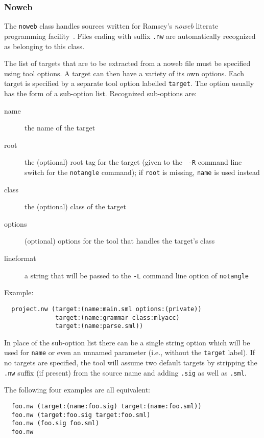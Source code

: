\documentclass[titlepage,letterpaper]{article}
\begin{document}
\subsubsection{Noweb}
\label{sec:builtin-tools:noweb}

The {\tt noweb} class handles sources written for Ramsey's {\it noweb}
literate programming facility~\cite{ramsey:simplified}.  Files ending
with suffix {\tt .nw} are automatically recognized as belonging to
this class.

The list of targets that are to be extracted from a noweb file must be
specified using tool options.  A target can then have a variety of its
own options.  Each target is specified by a separate tool option
labelled {\tt target}.  The option usually has the form of a
sub-option list.  Recognized sub-options are:

\begin{description}
\item[name] the name of the target
\item[root] the (optional) root tag for the target (given to the {\tt
-R} command line switch for the {\tt notangle} command); if {\tt root}
is missing, {\tt name} is used instead
\item[class] the (optional) class of the target
\item[options] (optional) options for the tool that handles the
target's class
\item[lineformat] a string that will be passed to the {\tt -L} command
line option of {\tt notangle}
\end{description}

Example:

\begin{verbatim}
  project.nw (target:(name:main.sml options:(private))
              target:(name:grammar class:mlyacc)
              target:(name:parse.sml))
\end{verbatim}

In place of the sub-option list there can be a single string option
which will be used for {\tt name} or even an unnamed parameter (i.e.,
without the {\tt target} label).  If no targets are specified, the
tool will assume two default targets by stripping the {\tt .nw}
suffix (if present) from the source name and adding {\tt .sig} as well
as {\tt .sml}.

The following four examples are all equivalent:

\begin{verbatim}
  foo.nw (target:(name:foo.sig) target:(name:foo.sml))
  foo.nw (target:foo.sig target:foo.sml)
  foo.nw (foo.sig foo.sml)
  foo.nw
\end{verbatim}
\end{document}
